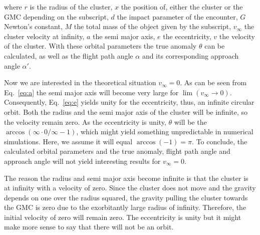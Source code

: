 \documentclass{aa}
\begin{document}
where $r$ is the radius of the cluster, $x$ the position of, either the cluster or the GMC depending on the subscript, $d$ the impact parameter of the encounter, $G$ Newton's constant, $M$ the total mass of the object given by the subscript, $v_\infty$ the cluster velocity at infinity, $a$ the semi major axis, $e$ the eccentricity, $v$ the velocity of the cluster. With these orbital parameters the true anomaly $\theta$ can be calculated, as well as the flight path angle $\alpha$ and its corresponding approach angle $\alpha'$.

Now we are interested in the theoretical situation $v_\infty = 0$. As can be seen from Eq.~\eqref{eq:a} the semi major axis will become very large for $\lim (v_\infty \rightarrow 0)$. Consequently, Eq.~\eqref{eq:e} yields unity for the eccentricity, thus, an infinite circular orbit. Both the radius and the semi major axis of the cluster will be infinite, so the velocity remain zero. As the eccentricity is unity, $\theta$ will be the $\arccos(\infty\cdot0/\infty - 1)$, which might yield something unpredictable in numerical simulations. Here, we assume it will equal $\arccos(-1) = \pi$. To conclude, the calculated orbital parameters and the true anomaly, flight path angle and approach angle will not yield interesting results for $v_\infty = 0$.

The reason the radius and semi major axis become infinite is that the cluster is at infinity with a velocity of zero. Since the cluster does not move and the gravity depends on one over the radius squared, the gravity pulling the cluster towards the GMC is zero due to the exorbitantly large radius of infinity. Therefore, the initial velocity of zero will remain zero. The eccentricity is unity but it might make more sense to say that there will not be an orbit. \\
% 
% 
% 
% 
\end{document}
